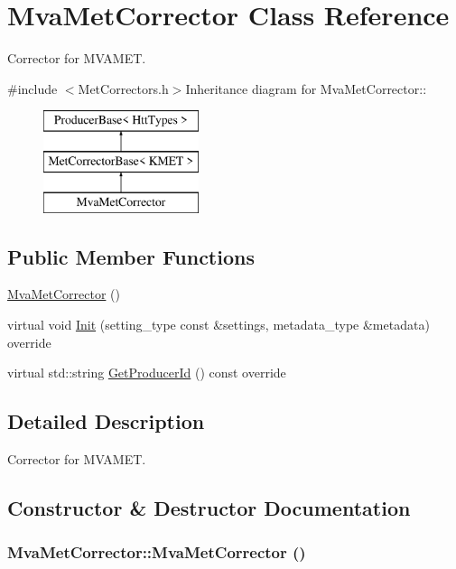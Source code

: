\hypertarget{classMvaMetCorrector}{
\section{MvaMetCorrector Class Reference}
\label{classMvaMetCorrector}
}


Corrector for MVAMET.  


{\ttfamily \#include $<$MetCorrectors.h$>$}Inheritance diagram for MvaMetCorrector::\begin{figure}[H]
\begin{center}
\leavevmode
\includegraphics[height=3cm]{classMvaMetCorrector}
\end{center}
\end{figure}
\subsection*{Public Member Functions}
\begin{DoxyCompactItemize}
\item 
\hyperlink{classMvaMetCorrector_a47eaa619a3fe249a952af75a783b452e}{MvaMetCorrector} ()
\item 
virtual void \hyperlink{classMvaMetCorrector_a82861f8921f0f9d792acd4f79ef1cff5}{Init} (setting\_\-type const \&settings, metadata\_\-type \&metadata) override
\item 
virtual std::string \hyperlink{classMvaMetCorrector_a8d8746113879239a418a3a22ee04cc99}{GetProducerId} () const override
\end{DoxyCompactItemize}


\subsection{Detailed Description}
Corrector for MVAMET. 

\subsection{Constructor \& Destructor Documentation}
\hypertarget{classMvaMetCorrector_a47eaa619a3fe249a952af75a783b452e}{
\subsubsection[{MvaMetCorrector}]{\setlength{\rightskip}{0pt plus 5cm}MvaMetCorrector::MvaMetCorrector ()}}
\label{classMvaMetCorrector_a47eaa619a3fe249a952af75a783b452e}


